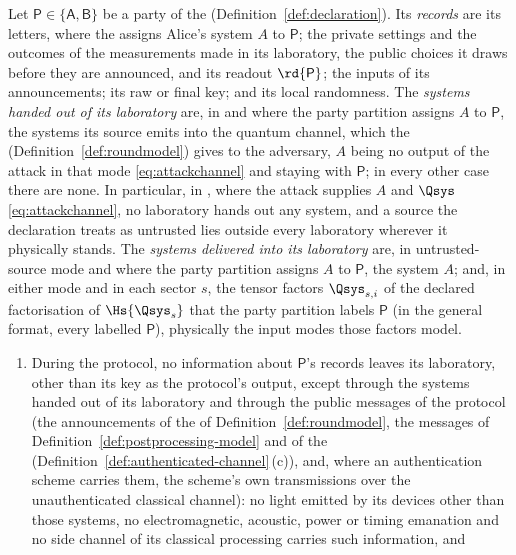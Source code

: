 \begin{assumption}\label{ass:lab}
Let $\mathsf P\in\{\mathsf A,\mathsf B\}$ be a party of the
 (Definition~\ref{def:declaration}). Its
\emph{records} are its letters, where the  assigns
Alice's system $A$ to $\mathsf P$; the private settings and the outcomes of
the measurements made in its laboratory, the public choices it draws before
they are announced, and its readout $\rd{\mathsf P}$; the inputs of its
announcements; its raw or final key; and its local randomness. The \emph{systems handed out of its laboratory} are, in
 and where the party partition assigns $A$ to
$\mathsf P$, the systems its source emits into the quantum channel, which the
 (Definition~\ref{def:roundmodel}) gives to the adversary,
$A$ being no output of the attack in that mode \eqref{eq:attackchannel} and
staying with $\mathsf P$; in every other case there are none. In particular,
in , where the attack supplies $A$ and $\Qsys$
\eqref{eq:attackchannel}, no laboratory hands out any system, and a source the declaration treats as untrusted lies
outside every laboratory wherever it physically stands. The \emph{systems
delivered into its laboratory} are, in untrusted-source mode and where the
party partition assigns $A$ to $\mathsf P$, the system $A$; and, in either
mode and in each sector $s$, the tensor factors $\Qsys_{s,i}$ of the declared
factorisation of $\Hs{\Qsys_s}$ that the party partition labels $\mathsf P$
(in the general format, every  labelled $\mathsf P$),
physically the input modes those factors model.
\begin{enumerate}[label=(\roman*),leftmargin=2.2em]
\item During the protocol, no information about $\mathsf P$'s records leaves
its laboratory, other than its key as the protocol's output, except through
the systems handed out of its laboratory and through the public messages of
the protocol (the announcements of the
 of Definition~\ref{def:roundmodel}, the
messages of Definition~\ref{def:postprocessing-model} and of the
(Definition~\ref{def:authenticated-channel}\,(c)), and, where an
authentication scheme carries them, the scheme's own transmissions over the
unauthenticated classical channel): no light emitted by its devices other
than those systems, no electromagnetic, acoustic, power or timing emanation
and no side channel of its classical processing carries such information, and

\end{enumerate}
\end{assumption}
